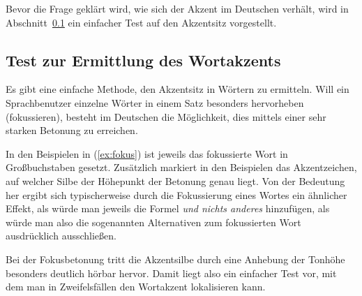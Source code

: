 \begin{exe}
\end{exe}

Bevor die Frage geklärt wird, wie sich der Akzent im Deutschen verhält, wird in Abschnitt~\ref{sec:akzentsitztest} ein einfacher Test auf den Akzentsitz vorgestellt.

\subsection{Test zur Ermittlung des Wortakzents}

\label{sec:akzentsitztest}



Es gibt eine einfache Methode, den Akzentsitz in Wörtern zu ermitteln.
Will ein Sprachbenutzer einzelne Wörter in einem Satz besonders hervorheben (fokussieren), besteht im Deutschen die Möglichkeit, dies mittels einer sehr starken Betonung zu erreichen.

\begin{exe}
  \ex\label{ex:fokus}
  \begin{xlist}
  \end{xlist}
\end{exe}

In den Beispielen in (\ref{ex:fokus}) ist jeweils das fokussierte Wort in Großbuchstaben gesetzt.
Zusätzlich markiert in den Beispielen das Akzentzeichen, auf welcher Silbe der Höhepunkt der Betonung genau liegt.
Von der Bedeutung her ergibt sich typischerweise durch die Fokussierung eines Wortes ein ähnlicher Effekt, als würde man jeweils die Formel \textit{und nichts anderes} hinzufügen, als würde man also die sogenannten Alternativen zum fokussierten Wort ausdrücklich ausschließen.

\begin{exe}
  \ex\label{ex:fokus-deutlich}
  \begin{xlist}
  \end{xlist}
\end{exe}

Bei der Fokusbetonung tritt die Akzentsilbe durch eine Anhebung der Tonhöhe besonders deutlich hörbar hervor.
Damit liegt also ein einfacher Test vor, mit dem man in Zweifelsfällen den Wortakzent lokalisieren kann.

